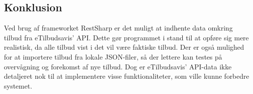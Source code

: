 \subsection{Konklusion}
Ved brug af frameworket RestSharp er det muligt at indhente data omkring tilbud fra eTilbudsavis' API. 
Dette gør programmet i stand til at opføre sig mere realistisk, da alle tilbud vist i det vil være faktiske tilbud.
Der er også mulighed for at importere tilbud fra lokale JSON-filer, så der lettere kan testes på overvågning og forekomst af nye tilbud. 
Dog er eTilbudsavis' API-data ikke detaljeret nok til at implementere visse funktionaliteter, som ville kunne forbedre systemet.
